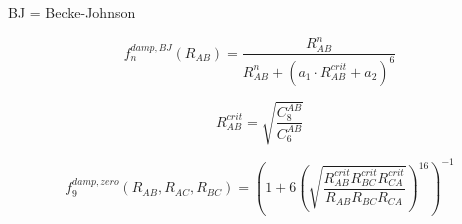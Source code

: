 \vspace{10pt}
\noindent
BJ = Becke-Johnson

\begin{equation}
  f_n^{damp,BJ}(R_{AB}) = \frac{R_{AB}^n}{R_{AB}^n + (a_1 \cdot R_{AB}^{crit} + a_2)^6}
\end{equation}

\begin{equation}
  R_{AB}^{crit} = \sqrt{\frac{C_8^{AB}}{C_6^{AB}}}
\end{equation}


\begin{equation}
  f_9^{damp,zero}(R_{AB}, R_{AC}, R_{BC}) = \left(1 + 6 \left(\sqrt{\frac{R_{AB}^{crit} R_{BC}^{crit} R_{CA}^{crit}}{R_{AB} R_{BC} R_{CA}}}\right)^{16}\right)^{-1}
\end{equation}
